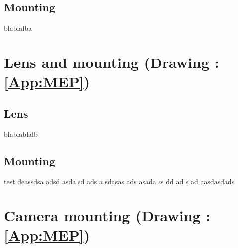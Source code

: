 \subsection{Mounting}
blablalba

\section{Lens and mounting (Drawing : \ref{App:MEP})}\label{sec:lens}
\subsection{Lens}
blablablalb
\subsection{Mounting}
test deassdsa adsd asda sd ads a sdasas ads asada ss dd ad s ad aasdasdads 

\section{Camera mounting (Drawing : \ref{App:MEP})}\label{sec:Camera}
